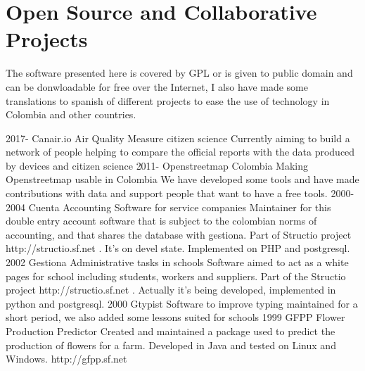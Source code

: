 \section{Open Source and Collaborative Projects}

The software presented here is covered by GPL or is given to public
domain and can be donwloadable for free over the Internet, I also have
made some translations to spanish of different projects to ease
the use of technology in Colombia and other countries.

\begin{entrylist}
  \entry
    {2017-}
    {Canair.io}
    {Air Quality Measure citizen science}
    {Currently aiming to build a network of people helping
    to compare the official reports with the data produced by devices and citizen science}
  \entry
    {2011-}
    {Openstreetmap Colombia}
    {Making Openstreetmap usable in Colombia}
    {We have developed some tools and have made contributions
    with data and support people that want to have a free tools.}
  \entry
    {2000-2004}
    {Cuenta}
    {Accounting Software for service companies}
    {Maintainer for this double entry account
    software that is subject to the colombian norms of accounting, and
    that shares the database with gestiona. Part of Structio  project
    http://structio.sf.net . It's on devel state. Implemented on
    PHP and postgresql.}
 \entry
    {2002}
    {Gestiona}
    {Administrative tasks in schools}
    {Software aimed to act as a white pages for school
    including students, workers and suppliers.  Part of the 
    Structio project http://structio.sf.net . Actually it's being
    developed, implemented in python and postgresql.}
  \entry
    {2000}
    {Gtypist}
    {Software to improve typing}
    {maintained for a short period, we also added some lessons suited for schools}
  \entry
    {1999}
    {GFPP}
    {Flower Production Predictor}
    {Created and maintained a
    package used to predict the production of flowers for a
    farm. Developed in Java and tested on Linux and Windows. http://gfpp.sf.net}
\end{entrylist}